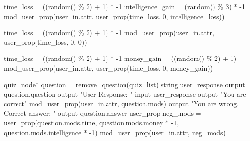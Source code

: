 \documentclass{article}
\begin{document}
\begin{algorithmic}
  \State time\_loss = ((random() \% 2) + 1) * -1
  \State intelligence\_gain = (random() \% 3) * -1
  \State mod\_user\_prop(user\_in.attr, user\_prop(time\_loss, 0, intelligence\_loss))
  \EndFunction
\end{algorithmic}
\begin{algorithmic}
  \State time\_loss = ((random() \% 2) + 1) * -1
  \State mod\_user\_prop(user\_in.attr, user\_prop(time\_loss, 0, 0))
  \EndFunction
\end{algorithmic}
\begin{algorithmic}
  \State time\_loss = ((random() \% 2) + 1) * -1
  \State money\_gain = ((random() \% 2) + 1)
  \State mod\_user\_prop(user\_in.attr, user\_prop(time\_loss, 0, money\_gain))
  \EndFunction
\end{algorithmic}
\begin{algorithmic}
  \State quiz\_node* question =  remove\_question(quiz\_list)
  \State string user\_response
  \State output question.question
  \State output "User Response: "
  \State input user\_response
    \State output "You are correct"
    \State mod\_user\_prop(user\_in.attr, question.mods)
  \Else
    \State output "You are wrong. Correct answer: "
    \State output question.answer
    \State user\_prop neg\_mods = user\_prop(question.mods.time, question.mods.money * -1, question.mods.intelligence * -1)
    \State mod\_user\_prop(user\_in.attr, neg\_mods)
  \EndIf
  \EndFunction
\end{algorithmic}
\end{document}
